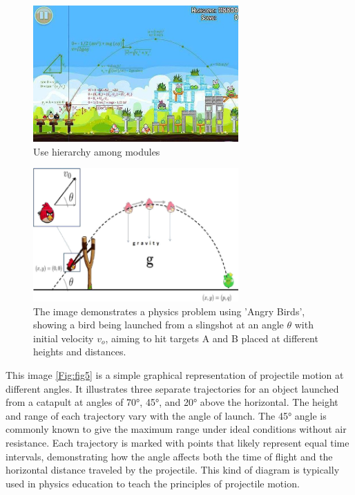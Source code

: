 \documentclass[12pt, titlepage]{article}
\begin{document}
\begin{figure}[H]
\centering
\includegraphics[width=0.7\textwidth]{fig3.jpg}
\caption{Use hierarchy among modules}
\label{Fig:fig3}
\end{figure}

\begin{figure}[H]
\centering
\includegraphics[width=0.7\textwidth]{fig4.png}
\caption{The image demonstrates a physics problem using 'Angry Birds', showing a bird being launched from a slingshot at an angle $\theta$ with initial velocity $v_o$, aiming to hit targets A and B placed at different heights and distances.}
\label{Fig:fig4}
\end{figure}

This image \ref{Fig:fig5} is a simple graphical representation of projectile motion at different angles. It illustrates three separate trajectories for an object launched from a catapult at angles of 70°, 45°, and 20° above the horizontal. The height and range of each trajectory vary with the angle of launch. The 45° angle is commonly known to give the maximum range under ideal conditions without air resistance. Each trajectory is marked with points that likely represent equal time intervals, demonstrating how the angle affects both the time of flight and the horizontal distance traveled by the projectile. This kind of diagram is typically used in physics education to teach the principles of projectile motion.
\end{document}
